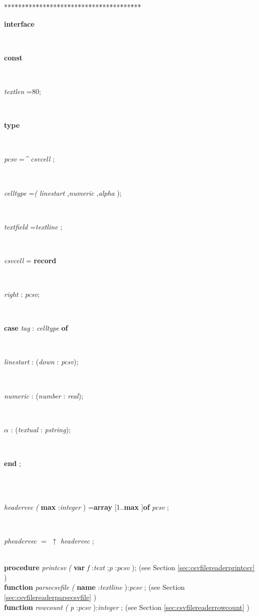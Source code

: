 \begin{tabbing}
***\=***\=***\=***\=***\=***\=***\=***\=***\=***\=***\=***\=***\=\kill
\\
\+\parbox{14cm}{\textsf{\textbf{interface} }}\\
\+\parbox{14cm}{\textsf{\textbf{const} }}\\
\parbox{14cm}{\textsf{\textit{textlen} =80;}}\\
\<\parbox{14cm}{\textsf{\textbf{type} }}\\
\parbox{14cm}{\textsf{\textit{pcsv} =\textit{\^{}} \textit{csvcell} ;}}\\
\parbox{14cm}{\textsf{\textit{celltype} =\textit{(} \textit{linestart} ,\textit{numeric} ,\textit{alpha} );}}\\
\parbox{14cm}{\textsf{\textit{textfield} =\textit{textline} ;}}\\
\+\parbox{14cm}{\textsf{\textit{csvcell}  = \textbf{record} }}\\
\parbox{14cm}{\textsf{\textit{right} : \textit{pcsv}}; }\\
\+\parbox{14cm}{\textsf {\textbf {case } \textsf{\textit{tag} : \textit{celltype}} \textbf{ of } }}\\
\parbox{14cm}{\textsf{\textit{linestart} : (\textit{down} : \textit{pcsv})}; }\\
\parbox{14cm}{\textsf{\textit{numeric} : (\textit{number} : \textit{real})}; }\\
\parbox{14cm}{\textsf{\textit{$\alpha$} : (\textit{textual} : \textit{pstring})}; }\\
\<\-\parbox{14cm}{\textsf{\textbf{end} ;}}\\
\\
\parbox{14cm}{\textsf{\textit{headervec} \textit{(} \textbf{max} :\textit{integer} ) =\textbf{array}  [1..\textbf{max} ]\textbf{of}  \textit{pcsv} ;}}\\
\parbox{14cm}{\textsf{\textit{pheadervec} $=$ $\uparrow$ \textit{headervec} }; }\\
\<\textsf{\textbf{procedure}  \textit{printcsv} \textit{(} \textbf{var}  \textit{f} :\textit{text} ;\textit{p} :\textit{pcsv} );} (see Section \ref{sec:csvfilereaderprintcsv} )\\
\<\textsf{\textbf{function}  \textit{parsecsvfile} \textit{(} \textbf{name} :\textit{textline} ):\textit{pcsv} ;} (see Section \ref{sec:csvfilereaderparsecsvfile} )\\
\<\textsf{\textbf{function}  \textit{rowcount} \textit{(} \textit{p} :\textit{pcsv} ):\textit{integer} ;} (see Section \ref{sec:csvfilereaderrowcount} )\\

\end{tabbing}
